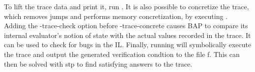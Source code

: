 To lift the trace data and print it, run .  It is also possible to concretize
the trace, which removes jumps and performs memory concretization, by
executing .  Adding the -trace-check option before
-trace-concrete causes BAP to compare its internal evaluator's notion
of state with the actual values recorded in the trace.  It can be used
to check for bugs in the IL.  Finally, running  will symbolically execute the
trace and output the generated verification condtion to the file f.
This can then be solved with stp to find satisfying answers to the trace.
